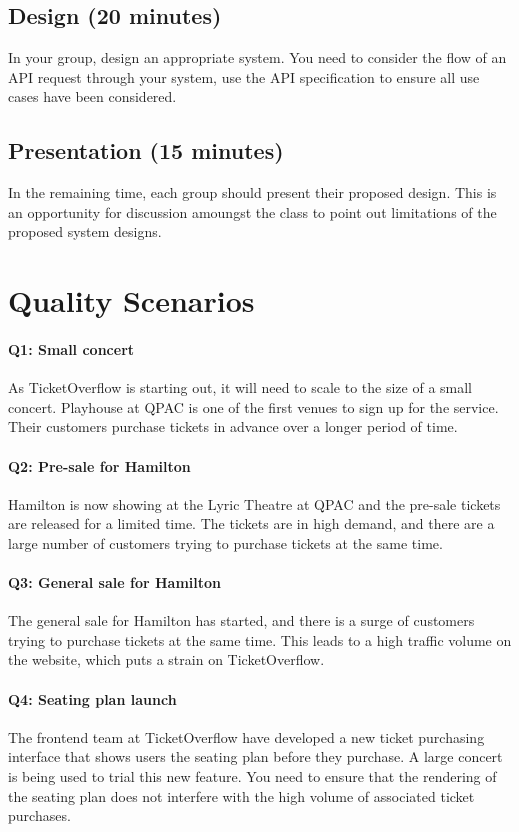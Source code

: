 \documentclass{csse4400}
\begin{document}
\subsection*{Design (20 minutes)}

In your group, design an appropriate system.
You need to consider the flow of an API request through your system,
use the API specification to ensure all use cases have been considered.

\subsection*{Presentation (15 minutes)}

In the remaining time,
each group should present their proposed design.
This is an opportunity for discussion amoungst the class to point out limitations of the proposed system designs.

\section{Quality Scenarios}\label{sec:scenarios}

\paragraph{Q1: Small concert}
As TicketOverflow is starting out,
it will need to scale to the size of a small concert.
Playhouse at QPAC is one of the first venues to sign up for the service.
Their customers purchase tickets in advance over a longer period of time.

\paragraph{Q2: Pre-sale for Hamilton}
Hamilton is now showing at the Lyric Theatre at QPAC and the pre-sale tickets are released for a limited time.
The tickets are in high demand, and there are a large number of customers trying to purchase tickets at the same time.

\paragraph{Q3: General sale for Hamilton}
The general sale for Hamilton has started, and there is a surge of customers trying to purchase tickets at the same time.
This leads to a high traffic volume on the website, which puts a strain on TicketOverflow.

\paragraph{Q4: Seating plan launch}
The frontend team at TicketOverflow have developed a new ticket purchasing interface that shows users the seating plan before they purchase.
A large concert is being used to trial this new feature.
You need to ensure that the rendering of the seating plan does not interfere with the high volume of associated ticket purchases.
\end{document}
